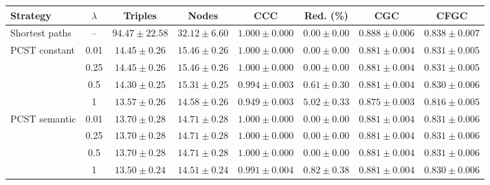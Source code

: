 \begingroup
\footnotesize
\setlength{\tabcolsep}{3pt}
\begin{tabular}{@{}lccccccc@{}}
\toprule
Strategy & $\lambda$ & Triples & Nodes & CCC & Red. (\%) & CGC & CFGC \\
\midrule
Shortest paths & -- & $94.47\pm22.58$ & $32.12\pm6.60$ & $1.000\pm0.000$ & $0.00\pm0.00$ & $0.888\pm0.006$ & $0.838\pm0.007$ \\
\midrule
PCST constant & 0.01 & $14.45\pm0.26$ & $15.46\pm0.26$ & $1.000\pm0.000$ & $0.00\pm0.00$ & $0.881\pm0.004$ & $0.831\pm0.005$ \\
 & 0.25 & $14.45\pm0.26$ & $15.46\pm0.26$ & $1.000\pm0.000$ & $0.00\pm0.00$ & $0.881\pm0.004$ & $0.831\pm0.005$ \\
 & 0.5 & $14.30\pm0.25$ & $15.31\pm0.25$ & $0.994\pm0.003$ & $0.61\pm0.30$ & $0.881\pm0.004$ & $0.830\pm0.006$ \\
 & 1 & $13.57\pm0.26$ & $14.58\pm0.26$ & $0.949\pm0.003$ & $5.02\pm0.33$ & $0.875\pm0.003$ & $0.816\pm0.005$ \\
\midrule
PCST semantic & 0.01 & $13.70\pm0.28$ & $14.71\pm0.28$ & $1.000\pm0.000$ & $0.00\pm0.00$ & $0.881\pm0.004$ & $0.831\pm0.006$ \\
 & 0.25 & $13.70\pm0.28$ & $14.71\pm0.28$ & $1.000\pm0.000$ & $0.00\pm0.00$ & $0.881\pm0.004$ & $0.831\pm0.006$ \\
 & 0.5 & $13.70\pm0.28$ & $14.71\pm0.28$ & $1.000\pm0.000$ & $0.00\pm0.00$ & $0.881\pm0.004$ & $0.831\pm0.006$ \\
 & 1 & $13.50\pm0.24$ & $14.51\pm0.24$ & $0.991\pm0.004$ & $0.82\pm0.38$ & $0.881\pm0.004$ & $0.830\pm0.006$ \\
\bottomrule
\end{tabular}
\endgroup
